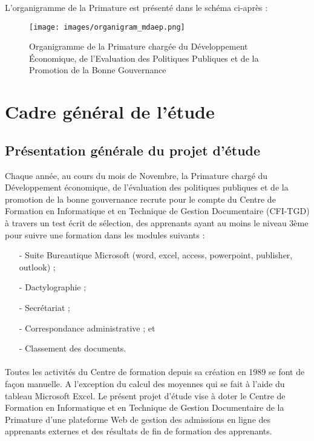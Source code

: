 L'organigramme de la Primature est présenté dans le schéma ci-après :
\begin{center}
	\begin{figure}
		\texttt{[image: images/organigram\_mdaep.png]}
		\caption{Organigramme de la Primature chargée du Développement Économique, de l'Evaluation des Politiques Publiques et de la Promotion de la Bonne Gouvernance}
	\end{figure}
\end{center}
  
\section{Cadre général de l'étude}
	\subsection{Présentation générale du projet d'étude}
Chaque année, au cours du mois de Novembre, la Primature chargé du Développement économique, de l'évaluation des politiques publiques et de la promotion de la bonne gouvernance recrute pour le compte du Centre de Formation en Informatique et en Technique de Gestion Documentaire (CFI-TGD) à travers un test écrit de sélection, des apprenants ayant au moins le niveau 3ème pour suivre une formation dans les modules suivants :
\begin{itemize}
	\item[-]Suite Bureautique Microsoft (word, excel, access, powerpoint, publisher, outlook) ; 
	\item[-]Dactylographie ;
	\item[-]Secrétariat ;
	\item[-]Correspondance administrative ; et
	\item[-]Classement des documents. 
\end{itemize}
\paragraph{}
Toutes les activités du Centre de formation depuis sa création en 1989 se font de façon manuelle. A l'exception du calcul des moyennes qui se fait à l'aide du tableau Microsoft Excel. 
Le présent projet d'étude vise à doter le Centre de Formation en Informatique et en Technique de Gestion Documentaire de la Primature d'une plateforme Web de gestion des admissions en ligne des apprenants externes et des résultats de fin de formation des apprenants. 

